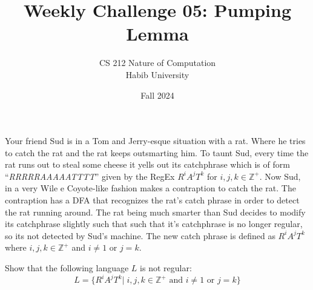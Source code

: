 \documentclass[a4paper]{exam}
\title{Weekly Challenge 05: Pumping Lemma}
\author{CS 212 Nature of Computation\\Habib University}
\date{Fall 2024}
\theoremstyle{definition}
\theoremstyle{claim}
\begin{document}
\maketitle

\begin{questions}
    Your friend Sud is in a Tom and Jerry-esque situation with a rat. Where he tries to catch the rat and the rat keeps outsmarting him. To taunt Sud, every time the rat runs out to steal some cheese it yells out its catchphrase which is of form ``\emph{RRRRRAAAAATTTT}'' given by the RegEx $R^iA^jT^k$ for $i,j,k \in \mathbb{Z}^+$. Now Sud, in a very Wile e Coyote-like fashion makes a contraption to catch the rat. The contraption has a DFA that recognizes the rat's catch phrase in order to detect the rat running around. The rat being much smarter than Sud decides to modify its catchphrase slightly such that such that it's catchphrase is no longer regular, so its not detected by Sud's machine. The new catch phrase is defined as $R^iA^jT^k$ where $i,j,k \in \mathbb{Z}^+$ and $i \neq 1$ or $j = k$.
    
    Show that the following language $L$ is not regular:
    $$L = \{R^iA^jT^k|\; i,j,k \in \mathbb{Z}^+ \text{ and } i \neq 1 \text{ or } j = k\}$$
    
    \begin{solution}

    \end{solution}
  
\end{questions}
\end{document}
